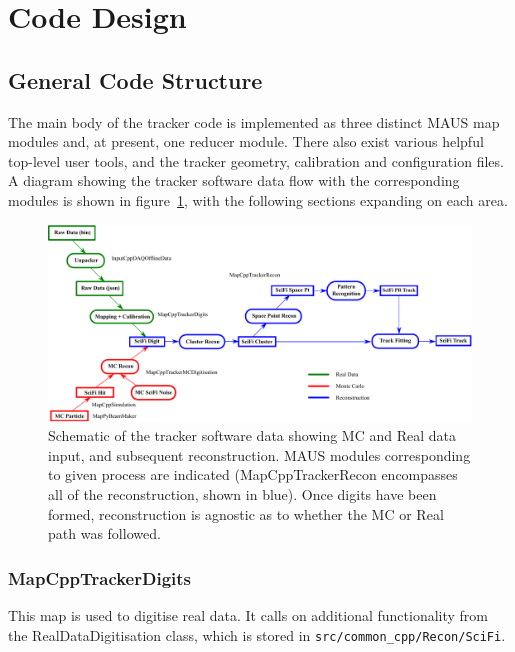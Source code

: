 \section{Code Design}
\label{Sect:CodeDesign}

\subsection{General Code Structure}

The main body of the tracker code is implemented as three distinct MAUS map modules and, at present, one reducer module.  There also exist various helpful top-level user tools, and the tracker geometry, calibration and configuration files. A diagram showing the tracker software data flow with the corresponding modules is shown in figure~\ref{Fig:DataFlow}, with the following sections expanding on each area.

\begin{figure}[p]
  \begin{center}
    \includegraphics[width=1.10\textwidth, angle=90]{detectors/tracker/06-CodeDesign/Figures/DataFlow.pdf}
  \end{center}
  \caption{Schematic of the tracker software data showing MC and Real data input, and subsequent reconstruction. MAUS modules corresponding to given process are indicated (MapCppTrackerRecon encompasses all of the reconstruction, shown in blue).  Once digits have been formed, reconstruction is agnostic as to whether the MC or Real path was followed.}
  \label{Fig:DataFlow}
\end{figure}

\subsubsection{MapCppTrackerDigits}
This map is used to digitise real data.  It calls on additional functionality from the RealDataDigitisation class, which is stored in \verb;src/common_cpp/Recon/SciFi;.

